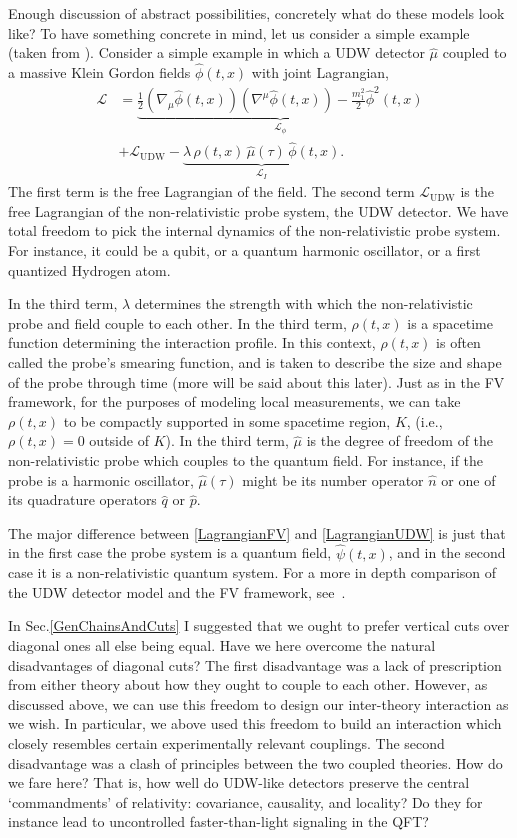 \documentclass[prd,twocolumn,superscriptaddress,floatfix,amsmath,amssymb,amsfonts,nofootinbib]{revtex4-2}
\begin{document}
Enough discussion of abstract possibilities, concretely what do these models look like? To have something concrete in mind, let us consider a simple example (taken from \cite{TaleOfTwo}). Consider a simple example in which a UDW detector $\hat{\mu}$ coupled to a massive Klein Gordon fields $\hat\phi(t,x)$ with joint Lagrangian,
\begin{align}\label{LagrangianUDW}
\mathcal{L}
&=\underbrace{\frac{1}{2}(\nabla_\mu\hat\phi(t,x))(\nabla^\mu\hat\phi(t,x))
-\frac{m_1^2}{2}\hat\phi^2(t,x)}_{\mathcal{L}_\phi}\\
\nonumber
&+\mathcal{L}_\text{UDW}-\underbrace{\lambda\,\rho(t,x)\,\hat\mu(\tau)\,\hat\phi(t,x)}_{\mathcal{L}_I}.
\end{align}
The first term is the free Lagrangian of the field. The second term $\mathcal{L}_\text{UDW}$ is the free Lagrangian of the non-relativistic probe system, the UDW detector. We have total freedom to pick the internal dynamics of the non-relativistic probe system. For instance, it could be a qubit, or a quantum harmonic oscillator, or a first quantized Hydrogen atom. 

In the third term, $\lambda$ determines the strength with which the non-relativistic probe and field couple to each other. In the third term, $\rho(t,x)$ is a spacetime function determining the interaction profile. In this context, $\rho(t,x)$ is often called the probe's smearing function, and is taken to describe the size and shape of the probe through time (more will be said about this later). Just as in the FV framework, for the purposes of modeling local measurements, we can take $\rho(t,x)$ to be compactly supported in some spacetime region, $K$, (i.e., $\rho(t,x)=0$ outside of $K$). In the third term, $\hat{\mu}$ is the degree of freedom of the non-relativistic probe which couples to the quantum field. For instance, if the probe is a harmonic oscillator, $\hat{\mu}(\tau)$ might be its number operator $\hat{n}$ or one of its quadrature operators $\hat{q}$ or $\hat{p}$.

The major difference between \eqref{LagrangianFV} and \eqref{LagrangianUDW} is just that in the first case the probe system is a quantum field, $\hat\psi(t,x)$, and in the second case it is a non-relativistic quantum system. For a more in depth comparison of the UDW detector model and the FV framework, see~\cite{TaleOfTwo}.

In Sec.\ref{GenChainsAndCuts} I suggested that we ought to prefer vertical cuts over diagonal ones all else being equal. Have we here overcome the natural disadvantages of diagonal cuts? The first disadvantage was a lack of prescription from either theory about how they ought to couple to each other. However, as discussed above, we can use this freedom to design our inter-theory interaction as we wish. In particular, we above used this freedom to build an interaction which closely resembles certain experimentally relevant couplings. The second disadvantage was a clash of principles between the two coupled theories. How do we fare here? That is, how well do UDW-like detectors preserve the central `commandments' of relativity: covariance, causality, and locality? Do they for instance lead to uncontrolled faster-than-light signaling in the QFT?
\end{document}
